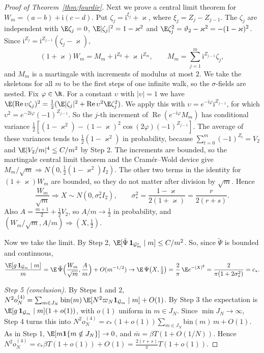 \begin{proof}[Proof of Theorem~\ref{thm:fourdir}]
Next we prove a central limit theorem for $W_m=(a-b)+\mathrm i(c-d)$. Put
$\zeta_j=\mathrm i^{\xi_j}+\varkappa$, where $\xi_j=Z_j-Z_{j-1}$. The $\zeta_j$ are independent with
$\E\zeta_j=0$, $\E\lvert\zeta_j\rvert^2=1-\varkappa^2$ and
$\E\zeta_j^2=\vartheta_2-\varkappa^2=-(1-\varkappa)^2$. Since
$\mathrm i^{Z_j}=\mathrm i^{Z_{j-1}}(\zeta_j-\varkappa)$,
\[
 (1+\varkappa)W_m=M_m+\mathrm i^{Z_0}+\varkappa\,\mathrm i^{Z_m},\qquad
 M_m=\sum_{j=1}^m\mathrm i^{Z_{j-1}}\zeta_j,
\]
and $M_m$ is a martingale with increments of modulus at most $2$. We take the skeletons for all $m$
to be the first steps of one infinite walk, so the $\sigma$-fields are nested. Fix $\varphi\in\R$. For a
constant $\upsilon$ with $\lvert\upsilon\rvert=1$ we have
$\E(\operatorname{Re}\upsilon\zeta_j)^2=\frac12(\E\lvert\zeta_j\rvert^2+\operatorname{Re}\upsilon^2\E\zeta_j^2)$.
We apply this with $\upsilon=e^{-\mathrm i\varphi}\mathrm i^{Z_{j-1}}$, for which
$\upsilon^2=e^{-2\mathrm i\varphi}(-1)^{Z_{j-1}}$.
So the $j$-th increment of $\operatorname{Re}(e^{-\mathrm i\varphi}M_m)$ has conditional variance
$\frac12[(1-\varkappa^2)-(1-\varkappa)^2\cos(2\varphi)(-1)^{Z_{j-1}}]$. The average of these
variances tends to $\frac12(1-\varkappa^2)$ in probability, because
$\sum_{t=0}^m(-1)^{Z_t}=V_2$ and $\E\lvert V_2/m\rvert^4\le C/m^2$ by Step 2. The increments are
bounded, so the martingale central limit theorem \cite[Cor.~3.1]{hallheyde1980} and the
Cram\'er--Wold device give $M_m/\sqrt m\Rightarrow N(0,\frac12(1-\varkappa^2)I_2)$. The other two terms in the identity for
$(1+\varkappa)W_m$ are bounded, so they do not matter after division by $\sqrt m$. Hence
\[
 \frac{W_m}{\sqrt m}\Rightarrow X\sim N(0,\sigma_*^2I_2),\qquad
 \sigma_*^2=\frac{1-\varkappa}{2(1+\varkappa)}=\frac r{2(r+s)}.
\]
Also $A=\frac{m+1}2+\frac12V_2$, so $A/m\to\frac12$ in probability, and
$(W_m/\sqrt m,A/m)\Rightarrow(X,\frac12)$.

Now we take the limit. By Step 2,
$\E[\tilde\Psi\,\mathbf 1_{\mathcal G_m^c}\mid m]\le C/m^2$. So, since $\tilde\Psi$ is bounded and
continuous,
\[
 \frac{\E[g\,\mathbf 1_{\mathcal G_m}\mid m]}m
 =\E\,\tilde\Psi\Bigl(\frac{W_m}{\sqrt m},\frac Am\Bigr)+O(m^{-1/2})
 \to\E\,\Psi\bigl(X,\tfrac12\bigr)=\frac2\pi\,\E e^{-\lvert X\rvert^2}
 =\frac2{\pi(1+2\sigma_*^2)}=c_*.
\]

\emph{Step 5 (conclusion).} By Steps 1 and 2,
$N^2o^{(4)}_N=\sum_{m\in J_N}\mathrm{bin}(m)\,\E[N^2\varpi_N\mathbf 1_{\mathcal G_m}\mid m]+O(1)$.
By Step 3 the expectation is $\E[g\,\mathbf 1_{\mathcal G_m}\mid m](1+o(1))$, with $o(1)$ uniform in
$m\in J_N$. Since $\min J_N\to\infty$, Step 4 turns this into
$N^2o^{(4)}_N=c_*(1+o(1))\sum_{m\in J_N}\mathrm{bin}(m)\,m+O(1)$. As in Step 1,
$\E[m\mathbf 1\{m\notin J_N\}]\to0$, and $\bar m=\beta T(1+O(1/N))$. Hence
$N^2o^{(4)}_N=c_*\beta T(1+o(1))+O(1)=\frac{2(r+s)}\pi T(1+o(1))$.
\end{proof}

